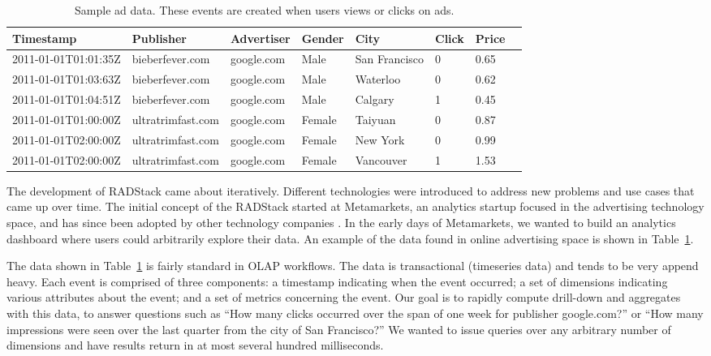 \documentclass{vldb}
\begin{document}
{\begin{table}
\centering
\begin{tabular}{| l | l | l | l | l | l | l | l |}
  \hline
  \textbf{Timestamp} & \textbf{Publisher} & \textbf{Advertiser} & \textbf{Gender} & \textbf{City} & \textbf{Click} & \textbf{Price} \\ \hline
  2011-01-01T01:01:35Z & bieberfever.com & google.com & Male & San Francisco & 0 & 0.65 \\ \hline
  2011-01-01T01:03:63Z & bieberfever.com & google.com & Male & Waterloo & 0 & 0.62 \\ \hline
  2011-01-01T01:04:51Z & bieberfever.com & google.com & Male & Calgary & 1 & 0.45 \\ \hline
  2011-01-01T01:00:00Z & ultratrimfast.com & google.com & Female & Taiyuan & 0 & 0.87 \\ \hline
  2011-01-01T02:00:00Z & ultratrimfast.com & google.com & Female & New York & 0 & 0.99 \\ \hline
  2011-01-01T02:00:00Z & ultratrimfast.com & google.com & Female & Vancouver & 1 & 1.53 \\ \hline
\end{tabular}
\caption{Sample ad data. These events are created when users views or clicks on ads.}
\label{tab:sample_data}
\end{table}

The development of RADStack came about iteratively. Different technologies were
introduced to address new problems and use cases that came up over time.
The initial concept of the RADStack started at Metamarkets, an analytics
startup focused in the advertising technology space, and has since been adopted
by other technology companies \cite{2014yahoo}. In the early days of Metamarkets, we wanted
to build an analytics dashboard where users could arbitrarily explore their
data. An example of the data found in online advertising space is shown in
Table~\ref{tab:sample_data}. 

The data shown in Table~\ref{tab:sample_data} is fairly standard in OLAP
workflows. The data is transactional (timeseries data) and tends to be very
append heavy. Each event is comprised of three components: a timestamp
indicating when the event occurred; a set of dimensions indicating various
attributes about the event; and a set of metrics concerning the event. Our goal
is to rapidly compute drill-down and aggregates with this data, to answer
questions such as “How many clicks occurred over the span of one week for
publisher google.com?” or “How many impressions were seen over the last quarter
from the city of San Francisco?” We wanted to issue queries over any arbitrary
number of dimensions and have results return in at most several hundred
milliseconds.

}
\end{document}
